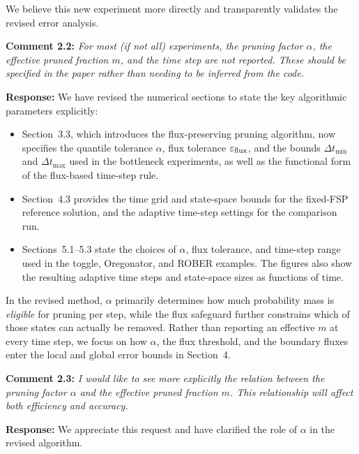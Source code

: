 \documentclass[11pt]{article}
\begin{document}
We believe this new experiment more directly and transparently validates the
revised error analysis.

\vspace{0.5em}

\noindent\textbf{Comment 2.2:} \textit{For most (if not all) experiments, the pruning factor $\alpha$, the
effective pruned fraction $m$, and the time step are not reported. These should
be specified in the paper rather than needing to be inferred from the code.}

\textbf{Response:} We have revised the numerical sections to state the key algorithmic
parameters explicitly:

\begin{itemize}
  \item Section~3.3, which introduces the flux-preserving pruning algorithm, now
        specifies the quantile tolerance $\alpha$, flux tolerance $\varepsilon_{\rm
        flux}$, and the bounds $\Delta t_{\min}$ and $\Delta t_{\max}$ used in the
        bottleneck experiments, as well as the functional form of the flux-based
        time-step rule.
  \item Section~4.3 provides the time grid and state-space bounds for the fixed-FSP
        reference solution, and the adaptive time-step settings for the comparison
        run.
  \item Sections~5.1–5.3 state the choices of $\alpha$, flux tolerance, and
        time-step range used in the toggle, Oregonator, and ROBER examples. The
        figures also show the resulting adaptive time steps and state-space sizes
        as functions of time.
\end{itemize}

In the revised method, $\alpha$ primarily determines how much probability mass is
\emph{eligible} for pruning per step, while the flux safeguard further constrains
which of those states can actually be removed. Rather than reporting an effective
$m$ at every time step, we focus on how $\alpha$, the flux threshold, and the
boundary fluxes enter the local and global error bounds in Section~4.

\vspace{0.5em}

\noindent\textbf{Comment 2.3:} \textit{I would like to see more explicitly the relation between the pruning
factor $\alpha$ and the effective pruned fraction $m$. This relationship will
affect both efficiency and accuracy.}

\textbf{Response:} We appreciate this request and have clarified the role of $\alpha$
in the revised algorithm.
\end{document}
